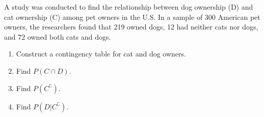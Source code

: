 \begin{exmp}
	A study was conducted to find the relationship between dog ownership (D) and cat ownership (C) among pet owners in the U.S.
	In a sample of 300 American pet owners, the researchers found that 219 owned dogs,
	12 had neither cats nor dogs,
	and 72 owned both cats and dogs.
	\begin{enumerate}
		\item Construct a contingency table for cat and dog owners.
		\item Find \( P(C \cap D) \).
		\item Find \( P(C^\complement) \).
		\item Find \( P(D | C^\complement) \).
	\end{enumerate}
\end{exmp}
